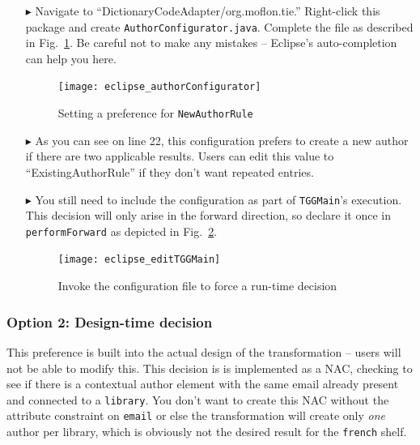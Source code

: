 \begin{itemize}

\item[$\blacktriangleright$] Navigate to ``DictionaryCodeAdapter/org.moflon.tie.'' Right-click this package and create
\texttt{Author\-Config\-ur\-at\-or.java}. Complete the file as described in Fig.~\ref{eclipse:authorConfig}. Be careful not to make any mistakes -- Eclipse's
auto-completion can help you here.

\begin{figure}[htbp]
\begin{center}
  \texttt{[image: eclipse\_authorConfigurator]}
  \caption{Setting a preference for \texttt{NewAuthorRule}}
  \label{eclipse:authorConfig}
\end{center}
\end{figure}

\clearpage

\item[$\blacktriangleright$] As you can see on line 22, this configuration prefers to create a new author if there are two applicable results. Users can edit
this value to ``ExistingAuthorRule'' if they don't want repeated entries.

\item[$\blacktriangleright$] You still need to include the configuration as part of \texttt{TGGMain}'s execution. This decision will only arise in the forward
direction, so declare it once in \texttt{performForward} as depicted in Fig.~\ref{eclipse:editTGGMain}.

\vspace{0.5cm}

\begin{figure}[htbp]
\begin{center}
  \texttt{[image: eclipse\_editTGGMain]}
  \caption{Invoke the configuration file to force a run-time decision}
  \label{eclipse:editTGGMain}
\end{center}
\end{figure}

\end{itemize}

\subsubsection{Option 2: Design-time decision}

This preference is built into the actual design of the transformation -- users will not be able to modify this. This decision is is implemented as a NAC,
checking to see if there is a contextual author element with the same email already present and connected to a \texttt{library}. You don't want to create this
NAC without the attribute constraint on \texttt{email} or else the transformation will create only \emph{one} author per library, which is obviously not the
desired result for the \texttt{french} shelf.

